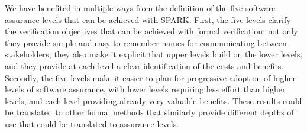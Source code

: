 \documentclass{llncs}
\begin{document}
We have benefited in multiple ways from the definition of the five software
assurance levels that can be achieved with SPARK. First, the five levels
clarify the verification objectives that can be achieved with formal
verification: not only they provide simple and easy-to-remember names for
communicating between stakeholders, they also make it explicit that upper
levels build on the lower levels, and they provide at each level a clear
identification of the costs and benefits. Secondly, the five levels make it
easier to plan for progressive adoption of higher levels of software assurance,
with lower levels requiring less effort than higher levels, and each level
providing already very valuable benefits. These results could be translated to
other formal methods that similarly provide different depths of use that could
be translated to assurance levels.




\end{document}
